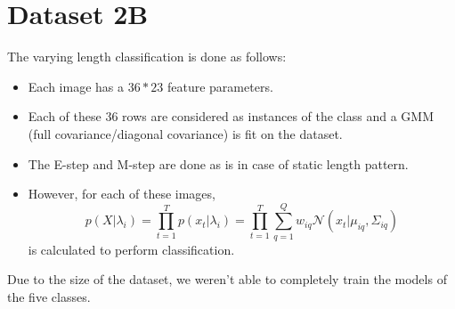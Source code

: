 \documentclass[11pt,a4paper]{article}
\newcommand{\noi}{\noindent}
\begin{document}
\break
\section{Dataset 2B}
The varying length classification is done as follows:
\begin{itemize}
    \itemsep0em
    \item Each image has a $36*23$ feature parameters.
    \item Each of these $36$ rows are considered as instances of the class and a GMM (full covariance/diagonal covariance) is fit on the dataset.
    \item The E-step and M-step are done as is in case of static length pattern.
    \item However, for each of these images, 
    \begin{equation}
    p (X|\lambda_i ) = \prod_{t=1}^T p(x_t|\lambda_i) = \prod_{t=1}^T \sum_{q=1}^Q w_{iq}\mathcal{N}(x_t|\mu_{iq}, \Sigma_{iq})
    \end{equation}
    is calculated to perform classification.
\end{itemize}

\noi
Due to the size of the dataset, we weren't able to completely train the models of the five classes. 
\end{document}
